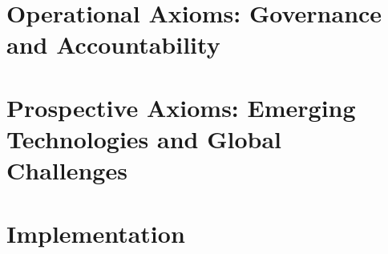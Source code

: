 \documentclass[12pt,a4paper,twoside,openright]{book}
\begin{document}
\part{Operational Axioms: Governance and Accountability}






\part{Prospective Axioms: Emerging Technologies and Global Challenges}












\part{Implementation}







\end{document}
